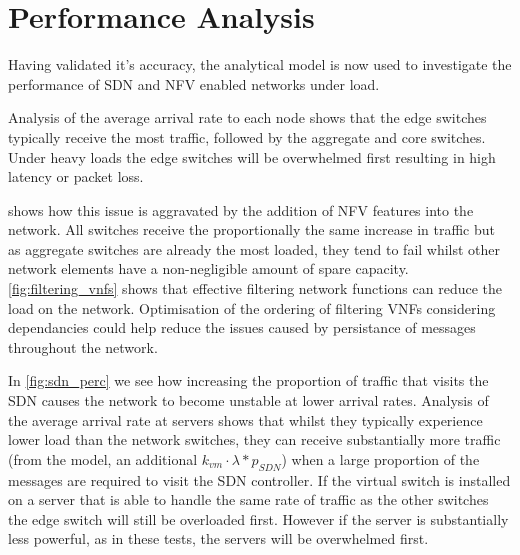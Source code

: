 \section{Performance Analysis}
Having validated it's accuracy, the analytical model is now used to investigate the performance of SDN and NFV enabled networks under load.

Analysis of the average arrival rate to each node shows that the edge switches typically receive the most traffic, followed by the aggregate and core switches. Under heavy loads the edge switches will be overwhelmed first resulting in high latency or packet loss.

 shows how this issue is aggravated by the addition of NFV features into the network. All switches receive the proportionally the same increase in traffic but as aggregate switches are already the most loaded, they tend to fail whilst other network elements have a non-negligible amount of spare capacity. \ref{fig:filtering_vnfs} shows that effective filtering network functions can reduce the load on the network. Optimisation of the ordering of filtering VNFs considering dependancies could help reduce the issues caused by persistance of messages throughout the network.

In \ref{fig:sdn_perc} we see how increasing the proportion of traffic that visits the SDN causes the network to become unstable at lower arrival rates. Analysis of the average arrival rate at servers shows that whilst they typically experience lower load than the network switches, they can receive substantially more traffic (from the model, an additional $k_{vm} \cdot \lambda * p_{SDN}$) when a large proportion of the messages are required to visit the SDN controller. If the virtual switch is installed on a server that is able to handle the same rate of traffic as the other switches the edge switch will still be overloaded first. However if the server is substantially less powerful, as in these tests, the servers will be overwhelmed first.